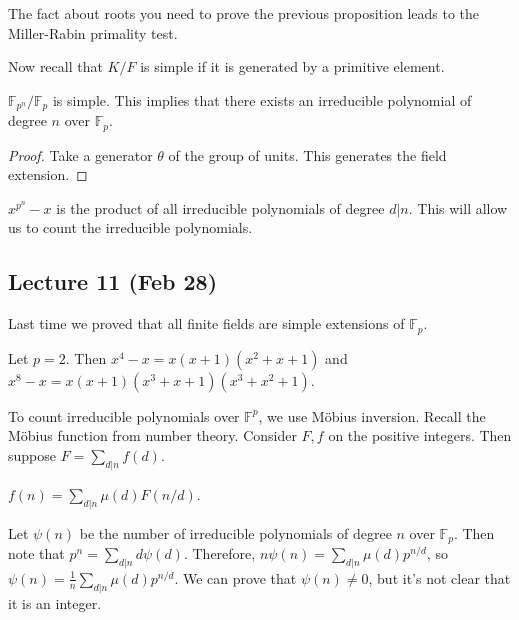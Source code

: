 \message{ !name(notes.tex)}\documentclass[10pt, twoside]{article}
\newcommand{\F}{\mathbb{F}}
\begin{document}
        \begin{rmk}
            The fact about roots you need to prove the previous proposition leads to the Miller-Rabin primality test.
        \end{rmk}

        Now recall that $K/F$ is simple if it is generated by a primitive element.

        \begin{cor}
            $\F_{p^n}/\F_p$ is simple. This implies that there exists an irreducible polynomial of degree $n$ over $\F_p$.
            \begin{proof}
                Take a generator $\theta$ of the group of units. This generates the field extension.
            \end{proof}
        \end{cor}

        \begin{rmk}
            $x^{p^n} - x$ is the product of all irreducible polynomials of degree $d | n$. This will allow us to count the irreducible polynomials.
        \end{rmk}

        \subsection{Lecture 11 (Feb 28)}
        
        Last time we proved that all finite fields are simple extensions of $\F_p$. 

        \begin{exm}
            Let $p = 2$. Then $x^4-x = x(x+1)(x^2+x+1)$ and $x^8-x = x(x+1)(x^3+x+1)(x^3+x^2+1)$.
        \end{exm}

        To count irreducible polynomials over $\F^p$, we use M\"obius inversion. Recall the M\"obius function from number theory. Consider $F,f$ on the positive integers. Then suppose $F = \sum_{d|n} f(d)$.

        \begin{thm}
            $f(n) = \sum_{d|n} \mu(d)F(n/d)$. 
        \end{thm}

        Let $\psi(n)$ be the number of irreducible polynomials of degree $n$ over $\F_p$. Then note that $p^n = \sum_{d|n} d\psi(d)$. Therefore, $n\psi(n) = \sum_{d|n}\mu(d)p^{n/d}$, so $\psi(n) = \frac{1}{n} \sum_{d|n} \mu(d)p^{n/d}$. We can prove that $\psi(n) \neq 0$, but it's not clear that it is an integer.
\end{document}
